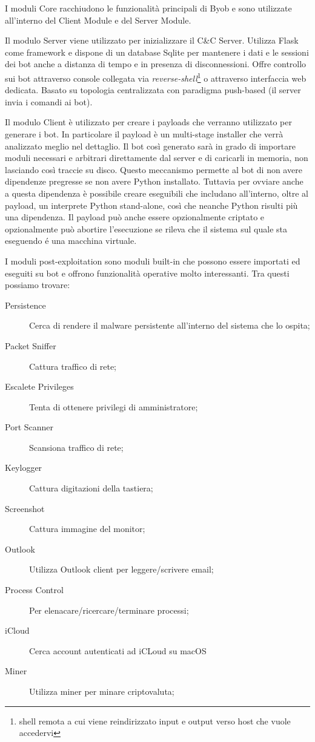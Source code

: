 I moduli Core racchiudono le funzionalità principali di Byob e sono utilizzate all'interno del Client Module e del Server Module.  

Il modulo Server viene utilizzato per inizializzare il C\&C Server. Utilizza Flask \cite{flask} come framework e  dispone di un database Sqlite \cite{sqlite} per mantenere i dati e le sessioni dei bot anche a distanza di tempo e in presenza di disconnessioni. Offre controllo sui bot attraverso console collegata via \textit{reverse-shell}\footnote{shell remota a cui viene reindirizzato input e output verso host che vuole accedervi} o attraverso interfaccia web dedicata. Basato su topologia centralizzata con paradigma push-based (il server invia i comandi ai bot).

Il modulo Client è utilizzato per creare i payloads che verranno utilizzato per generare i bot. In particolare il payload è un multi-stage installer che verrà analizzato meglio nel dettaglio.  Il bot così generato sarà in grado di importare moduli necessari e arbitrari direttamente dal server e di caricarli in memoria, non lasciando così traccie su disco. Questo meccanismo permette al bot di non avere dipendenze pregresse se non avere Python installato. Tuttavia per ovviare anche a questa dipendenza è possibile creare eseguibili che includano all'interno, oltre al payload, un interprete Python stand-alone, così che neanche Python risulti più una dipendenza.  Il payload può anche essere opzionalmente criptato e opzionalmente può abortire l'esecuzione se rileva che il sistema sul quale sta eseguendo é una macchina virtuale.

I moduli post-exploitation sono moduli built-in che possono essere importati ed eseguiti su bot e offrono funzionalità operative molto interessanti.
Tra questi possiamo trovare:

\begin{description}
    \item [Persistence] Cerca di rendere il malware persistente all'interno del sistema che lo ospita;
    \item [Packet Sniffer] Cattura traffico di rete;
    \item [Escalete Privileges] Tenta di ottenere privilegi di amministratore;
    \item [Port Scanner] Scansiona traffico di rete;
    \item [Keylogger] Cattura digitazioni della tastiera;
    \item [Screenshot] Cattura immagine del monitor;
    \item [Outlook] Utilizza Outlook client per leggere/scrivere email;
    \item [Process Control] Per elenacare/ricercare/terminare processi;
    \item [iCloud] Cerca account autenticati ad iCLoud su macOS
    \item [Miner] Utilizza miner per minare criptovaluta;
\end{description}

